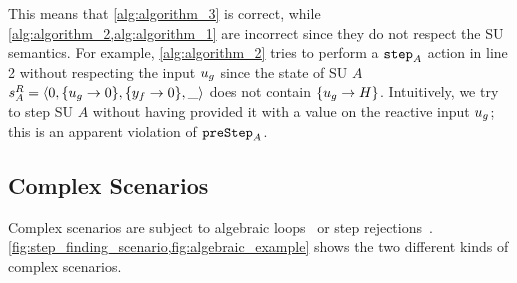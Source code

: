 This means that \cref{alg:algorithm_3} is correct, while \cref{alg:algorithm_2,alg:algorithm_1} are incorrect since they do not respect the SU semantics.
For example, \cref{alg:algorithm_2} tries to perform a $\mathtt{step}_{A}$ action in line 2 without respecting the input $u_{g}$ since the state of SU $A$ $s^{R}_{A} =  \left\langle 0,\{u_{g} \to 0 \}, \{y_{f} \to 0 \}, \_ \right\rangle $ does not contain $\{u_{g} \to H \}$.
Intuitively, we try to step SU $A$ without having provided it with a value on the reactive input $u_{g}$; this is an apparent violation of $\mathtt{preStep}_{A}$.
  
\subsection{Complex Scenarios}
Complex scenarios are subject to algebraic loops~\cite{Kubler2000} or step rejections~\cite{thrane2021}.
\cref{fig:step_finding_scenario,fig:algebraic_example} shows the two different kinds of complex scenarios.

